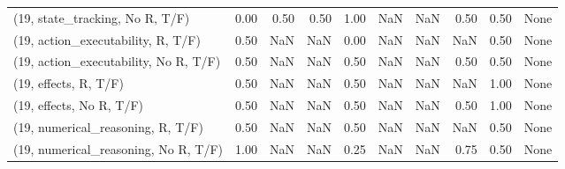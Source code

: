 \begin{table*}[h!]
\begin{adjustbox}{width=2\columnwidth,center}
\begin{tabular}{lrrr|rrr|rrr}
(19, state\_tracking, No R, T/F)       &                      0.00 &                  0.50 &                      0.50 &                          1.00 &                       NaN &                           NaN &                                   0.50 &                               0.50 &                                  None \\
(19, action\_executability, R, T/F)    &                      0.50 &                   NaN &                       NaN &                          0.00 &                       NaN &                           NaN &                                    NaN &                               0.50 &                                  None \\
(19, action\_executability, No R, T/F) &                      0.50 &                   NaN &                       NaN &                          0.50 &                       NaN &                           NaN &                                   0.50 &                               0.50 &                                  None \\
(19, effects, R, T/F)                 &                      0.50 &                   NaN &                       NaN &                          0.50 &                       NaN &                           NaN &                                    NaN &                               1.00 &                                  None \\
(19, effects, No R, T/F)              &                      0.50 &                   NaN &                       NaN &                          0.50 &                       NaN &                           NaN &                                   0.50 &                               1.00 &                                  None \\
(19, numerical\_reasoning, R, T/F)     &                      0.50 &                   NaN &                       NaN &                          0.50 &                       NaN &                           NaN &                                    NaN &                               0.50 &                                  None \\
(19, numerical\_reasoning, No R, T/F)  &                      1.00 &                   NaN &                       NaN &                          0.25 &                       NaN &                           NaN &                                   0.75 &                               0.50 &                                  None \\

\end{tabular}
\end{adjustbox}
\end{table*}
